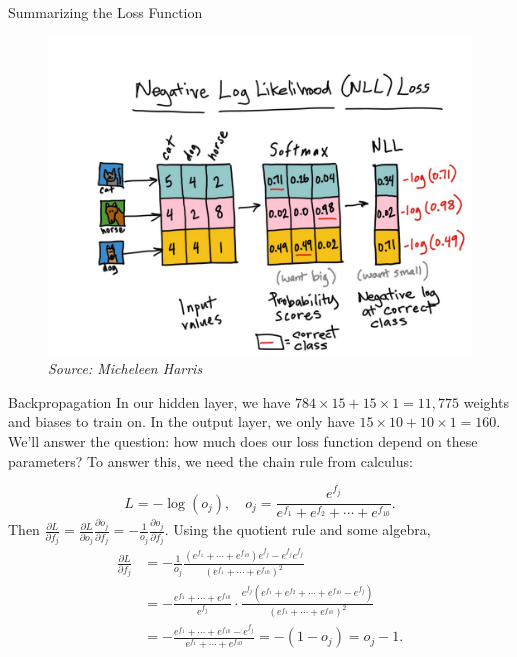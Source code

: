 \documentclass[xcolor=dvipsnames, fontsize=11pt, %
pagesize, %
parskip=half-, t]{beamer}
\begin{document}
 \begin{frame}{Summarizing the Loss Function}
 \begin{figure}[H] \center \includegraphics[scale=0.18]{fullpic.jpg}
 \caption{\textit{Source: Micheleen Harris}}
 \end{figure}
 \end{frame}
  \begin{frame}{Backpropagation} 
In our hidden layer, we have $784\times 15+15\times 1=11,775$ weights and biases to train on. In the output layer, we only have $15\times 10+10\times 1=160$. \pause We'll answer the question: how much does our loss function depend on these parameters?  To answer this, we need the chain rule from calculus: \pause

$$L=-\log \left(o_j\right), \quad o_j=\frac{e^{f_j}}{e^{f_1}+e^{f_2}+\cdots+e^{f_{10}}}.$$
Then $\frac{\partial L}{\partial f_j}=\frac{\partial L}{\partial o_j}\frac{\partial o_j}{\partial f_j}=-\frac{1}{o_j}\frac{\partial o_j}{\partial f_j}$. Using the quotient rule and some algebra, \pause \begin{align*} \frac{\partial L}{\partial f_j}&=-\frac{1}{o_j}\frac{\left(e^{f_1}+\cdots+e^{f_{10}}\right)e^{f_j}-e^{f_j}e^{f_j}}{\left(e^{f_1}+\cdots+e^{f_{10}}\right)^2} \\ &=-\frac{e^{f_1}+\cdots+e^{f_{10}}}{e^{f_j}}\cdot \frac{e^{f_j}\left(e^{f_1}+e^{f_2}+\cdots+e^{f_{10}}-e^{f_j}\right)}{\left(e^{f_1}+\cdots+e^{f_{10}}\right)^2} \\ &=-\frac{e^{f_1}+\cdots+e^{f_{10}}-e^{f_j}}{e^{f_1}+\cdots+e^{f_{10}}}=-\left(1-o_j\right)=o_j-1. \end{align*}

  \end{frame}
\end{document}

